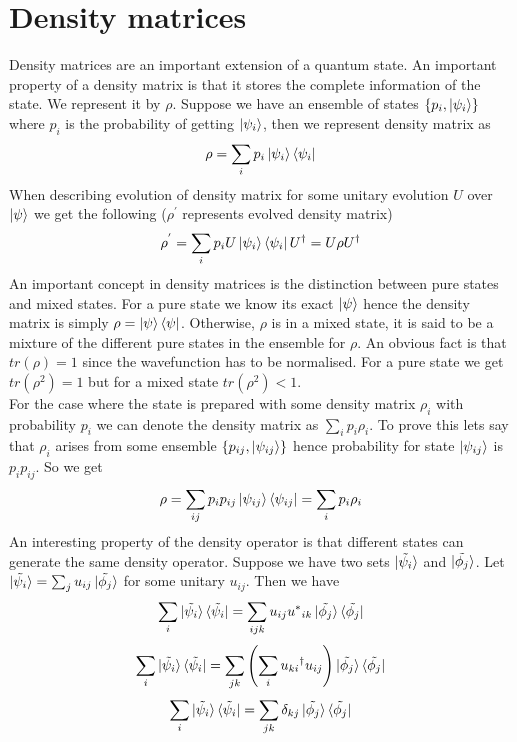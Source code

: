 \documentclass{report}
\begin{document}
\section{Density matrices}
Density matrices are an important extension of a quantum state. An important property of a density matrix is that it stores the complete information of the state. We represent it by $\rho$. Suppose we have an ensemble of states $\{p_i, \ket{\psi_i}\}$ where $p_i$ is the probability of getting $\ket{\psi_i}$, then we represent density matrix as
$$\rho = \sum_{i}p_i\ket{\psi_i}\bra{\psi_i}$$
When describing evolution of density matrix for some unitary evolution $U$ over $\ket{\psi}$ we get the following ($\rho^{'}$ represents evolved density matrix)
$$\rho^{'} = \sum_{i}p_{i}U\ket{\psi_i}\bra{\psi_i}U^{\dagger} = U{\rho}U^{\dagger}$$
An important concept in density matrices is the distinction between pure states and mixed states. For a pure state we know its exact $\ket{\psi}$ hence the density matrix is simply $\rho = \ket{\psi}\bra{\psi}$. 
Otherwise, $\rho$ is in a mixed state, it is said to be a mixture of the different pure states in the ensemble for $\rho$.
An obvious fact is that $tr(\rho) = 1$ since the wavefunction has to be normalised. For a pure state we get $tr({\rho}^2) = 1$ but for a mixed state $tr({\rho}^2) < 1$.\\
For the case where the state is prepared with some density matrix $\rho_i$ with probability $p_i$ we can denote the density matrix as $\sum_{i}p_{i}\rho_{i}$. To prove this lets say that $\rho_i$ arises from some ensemble $\{p_{ij},\ket{\psi_{ij}}\}$ hence probability for state $\ket{\psi_{ij}}$ is $p_{i}p_{ij}$. So we get
$$\rho = \sum_{ij}p_{i}p_{ij}\ket{\psi_{ij}}\bra{\psi_{ij}} = \sum_{i}p_{i}\rho_{i}$$
An interesting property of the density operator is that different states can generate the same density operator. Suppose we have two sets $\ket{\tilde{\psi_i}}$ and $\ket{\tilde{\phi_j}}$. Let $\ket{\tilde{\psi_i}} = \sum_{j}u_{ij}\ket{\tilde{\phi_j}}$ for some unitary $u_{ij}$. Then we have
\begin{equation}\sum_{i}\ket{\tilde{\psi_i}}\bra{\tilde{\psi_i}} = \sum_{ijk}u_{ij}{u^{*}}_{ik}\ket{\tilde{\phi_j}}\bra{\tilde{\phi_j}}\end{equation}
\begin{equation}\sum_{i}\ket{\tilde{\psi_i}}\bra{\tilde{\psi_i}} = \sum_{jk}\left(\sum_{i}{u_{ki}}^{\dagger}u_{ij}\right)\ket{\tilde{\phi_j}}\bra{\tilde{\phi_j}}\end{equation}
\begin{equation}\sum_{i}\ket{\tilde{\psi_i}}\bra{\tilde{\psi_i}} = \sum_{jk}\delta_{kj}\ket{\tilde{\phi_j}}\bra{\tilde{\phi_j}}\end{equation}
\end{document}
